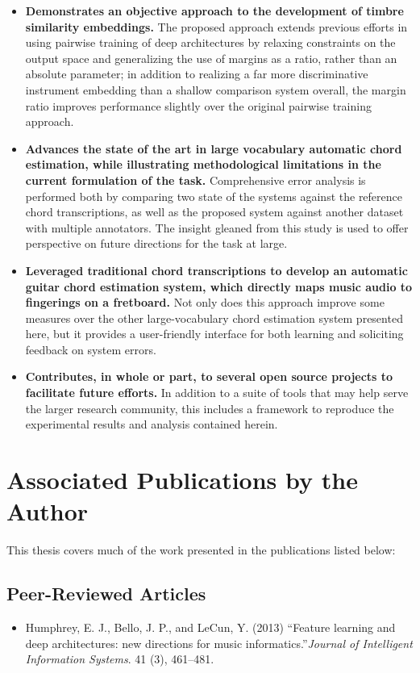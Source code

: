 \begin{itemize}
  \onehalfspacing
\item \textbf{Demonstrates an objective approach to the development of timbre similarity embeddings.} The proposed approach extends previous efforts in using pairwise training of deep architectures by relaxing constraints on the output space and generalizing the use of margins as a ratio, rather than an absolute parameter; in addition to realizing a far more discriminative instrument embedding than a shallow comparison system overall, the margin ratio improves performance slightly over the original pairwise training approach.
\item \textbf{Advances the state of the art in large vocabulary automatic chord estimation, while illustrating methodological limitations in the current formulation of the task.} Comprehensive error analysis is performed both by comparing two state of the systems against the reference chord transcriptions, as well as the proposed system against another dataset with multiple annotators. The insight gleaned from this study is used to offer perspective on future directions for the task at large.
\item \textbf{Leveraged traditional chord transcriptions to develop an automatic guitar chord estimation system, which directly maps music audio to fingerings on a fretboard.} Not only does this approach improve some measures over the other large-vocabulary chord estimation system presented here, but it provides a user-friendly interface for both learning and soliciting feedback on system errors.
\item \textbf{Contributes, in whole or part, to several open source projects to facilitate future efforts.} In addition to a suite of tools that may help serve the larger research community, this includes a framework to reproduce the experimental results and analysis contained herein.
\end{itemize}


\section{Associated Publications by the Author}

This thesis covers much of the work presented in the publications listed below:

\subsection{Peer-Reviewed Articles}
\renewcommand{\thefootnote}{\fnsymbol{footnote}}
\vspace{1em}
\begin{itemize}
\onehalfspacing
\item Humphrey, E. J., Bello, J. P., and LeCun, Y. (2013) ``Feature learning and deep architectures: new directions for music informatics.''{\it Journal of Intelligent Information Systems}. 41 (3), 461--481.

\end{itemize}

